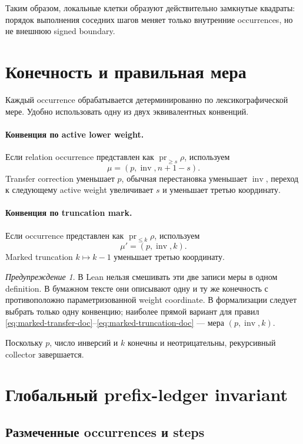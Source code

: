 \documentclass[11pt,a4paper]{article}
\theoremstyle{definition}
\theoremstyle{remark}
\newtheorem{warning}[theorem]{Предупреждение}
\newcommand{\pr}{\operatorname{pr}}
\begin{document}
Таким образом, локальные клетки образуют действительно замкнутые квадраты:
порядок выполнения соседних шагов меняет только внутренние occurrences, но не
внешнюю signed boundary.

\section{Конечность и правильная мера}

Каждый occurrence обрабатывается детерминированно по лексикографической мере.
Удобно использовать одну из двух эквивалентных конвенций.

\paragraph{Конвенция по active lower weight.}
Если relation occurrence представлен как $\pr_{\ge s}\rho$, используем
\[
 \mu=(p,\operatorname{inv},n+1-s).
\]
Transfer correction уменьшает $p$, обычная перестановка уменьшает
$\operatorname{inv}$, переход к следующему active weight увеличивает $s$ и
уменьшает третью координату.

\paragraph{Конвенция по truncation mark.}
Если occurrence представлен как $\pr_{\le k}\rho$, используем
\[
 \mu'=(p,\operatorname{inv},k).
\]
Marked truncation $k\mapsto k-1$ уменьшает третью координату.

\begin{warning}
В Lean нельзя смешивать эти две записи меры в одном definition. В бумажном
тексте они описывают одну и ту же конечность с противоположно
параметризованной weight coordinate. В формализации следует выбрать только
одну конвенцию; наиболее прямой вариант для правил
\eqref{eq:marked-transfer-doc}--\eqref{eq:marked-truncation-doc} --- мера
$(p,\operatorname{inv},k)$.
\end{warning}

Поскольку $p$, число инверсий и $k$ конечны и неотрицательны, рекурсивный
collector завершается.

\section{Глобальный prefix-ledger invariant}

\subsection{Размеченные occurrences и steps}
\end{document}
